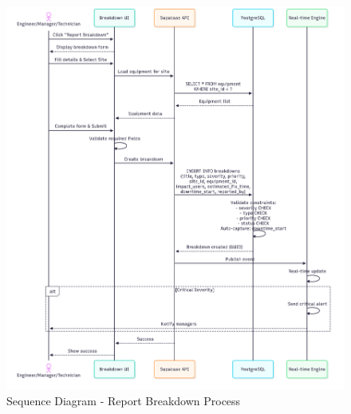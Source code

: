 \begin{figure}[H]
    \centering
    \includegraphics[width=0.95\linewidth]{img/chap_05/sprint3_sequence_breakdown.png}
    \caption{Sequence Diagram - Report Breakdown Process}
    \label{fig:sequence_report_breakdown}
\end{figure}

